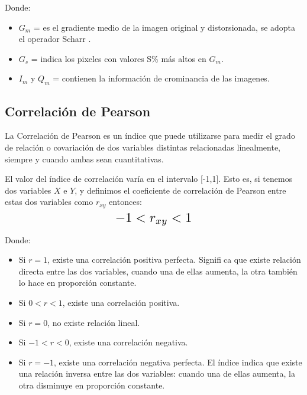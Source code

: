 \documentclass[spanish,twocolumn]{article}
\begin{document}
Donde:
\begin{itemize}
 \item $G_{m}$ =  es el gradiente medio de la imagen original y distorsionada, se adopta el operador Scharr  \cite{gradiente}.
 \item $ G_{s}$ = indica los pixeles con valores S\% más altos en $G_{m}$.
 \item  $I_{m}$ y $Q_{m}$ = contienen la información de crominancia de las imagenes. 
\end{itemize} 

\subsection{Correlación de Pearson}
\label{ssec:correlacion}%
La Correlación de Pearson \cite{correlacion} es un índice que puede utilizarse para medir el grado de relación o covariación de dos variables distintas relacionadas linealmente,  siempre y cuando ambas sean cuantitativas.

El valor del  índice de correlación varía en el intervalo [-1,1]. Esto es, si tenemos dos variables $X$ e $Y$, y definimos el coeficiente de correlación de Pearson entre estas dos variables como $r_{xy}$ entonces: 
\begin{equation}\label{eq:gm}
\resizebox{.3\hsize}{!}
{
$-1<r_{xy}<1$ 
}
\end{equation}

Donde:
\begin{itemize}
\item Si $r = 1$, existe una correlación positiva perfecta. Significa que existe relación directa entre las dos variables, cuando una de ellas aumenta, la otra también lo hace en proporción constante.
\item Si $0<r<1$, existe una correlación positiva.
\item Si $r = 0$, no existe relación lineal.
\item Si $-1<r<0$, existe una correlación negativa.
\item Si $r = -1$, existe una correlación negativa perfecta. El índice indica que existe una relación inversa entre las dos variables: cuando una de ellas aumenta, la otra disminuye en proporción constante.
\end{itemize}
\end{document}
